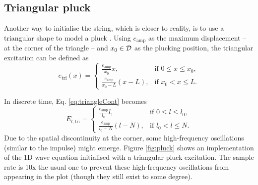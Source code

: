 \subsection{Triangular pluck}\label{sec:pluck}
Another way to initialise the string, which is closer to reality, is to use a triangular shape to model a pluck \cite{Fletcher1998, theBible}.%
%
Using $e_\text{amp}$ as the maximum displacement -- at the corner of the triangle -- and $x_0\in \mathcal{D}$ as the plucking position, the triangular excitation can be defined as
\begin{equation}\label{eq:triangleCont}
    e_\text{tri}(x) = \begin{cases}
        \frac{e_\text{amp}}{x_0} x, & \text{if } 0\leq x \leq x_0,\\
        \frac{e_\text{amp}}{x_0 - L} (x - L), &\text{if } x_0 < x \leq L.
    \end{cases}
\end{equation}

In discrete time, Eq. \eqref{eq:triangleCont} becomes 
\begin{equation}
    E_{l, \text{tri}} = \begin{cases}
        \frac{e_\text{amp}}{l_0} l, & \text{if } 0\leq l \leq l_0,\\
        \frac{e_\text{amp}}{l_0 - N} (l - N), &\text{if } l_0 < l \leq N.
    \end{cases}
\end{equation}
Due to the spatial discontinuity at the corner, some high-frequency oscillations (similar to the impulse) might emerge. Figure \ref{fig:pluck} shows an implementation of the 1D wave equation initialised with a triangular pluck excitation. The sample rate is 10x the usual one to prevent these high-frequency oscillations from appearing in the plot (though they still exist to some degree). 

